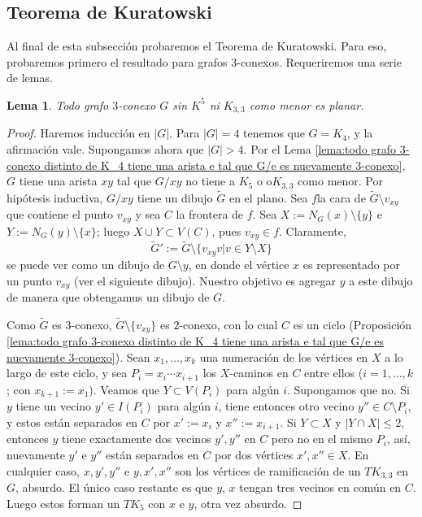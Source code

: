 \documentclass[12pt]{report}
\theoremstyle{plain}
\newtheorem{lemma}[theorem]{Lema}
\theoremstyle{definition}
\newcommand{\abs}[1]{\left \vert #1 \right \vert}
\begin{document}
\subsection{Teorema de Kuratowski}

Al final de esta subsección probaremos el Teorema de Kuratowski. Para eso, probaremos primero el resultado para grafos $3$-conexos. Requeriremos una serie de lemas.

\begin{lemma}\label{lema:teorema de Kuratowski - lema 1}
Todo grafo $3$-conexo $G$ sin $K^5$ ni $K_{3,3}$ como menor es planar.
\end{lemma}
\begin{proof}
Haremos inducción en $\abs G$. Para $\abs G = 4$ tenemos que $G = K_4$, y la afirmación vale. Supongamos ahora que $\abs G > 4$. Por el Lema \ref{lema:todo grafo 3-conexo distinto de K_4 tiene una arista e tal que G/e es nuevamente 3-conexo}, $G$ tiene una arista $xy$ tal que $G/xy$ no tiene a $K_5$ o o$K_{3,3}$ como menor. Por hipótesis inductiva, $G/xy$ tiene un dibujo $\tilde G$ en el plano. Sea $f$la cara de $\tilde G \setminus v_{xy}$ que contiene el punto $v_{xy}$ y sea $C$ la frontera de $f$. Sea $X := N_G (x) \setminus \{y\}$ e $Y := N_G (y) \setminus \{x \}$; luego $X \cup Y \subset V(C)$, pues $v_{xy} \in f$. Claramente,
\[
    \tilde G ' := \tilde G \setminus \{ v_{xy} v | v \in Y \setminus X \}
\]
se puede ver como un dibujo de $G \setminus y$, en donde el vértice $x$ es representado por un punto $v_{xy}$ (ver el siguiente dibujo). Nuestro objetivo es agregar $y$ a este dibujo de manera que obtengamus un dibujo de $G$.


Como $\tilde G$ es $3$-conexo, $\tilde G \setminus \{v_{xy}\}$ es $2$-conexo, con lo cual $C$ es un ciclo (Proposición \ref{lema:todo grafo 3-conexo distinto de K_4 tiene una arista e tal que G/e es nuevamente 3-conexo}). Sean $x_1, \ldots, x_k$ una numeración de los vértices en $X$ a lo largo de este ciclo, y sea $P_i = x_i \cdots x_{i+1}$ los $X$-caminos en $C$ entre ellos ($i = 1, \ldots, k$; con $x_{k+1} := x_1$). Veamos que $Y \subset V(P_i)$ para algún $i$. Supongamos que no. Si $y$ tiene un vecino $y' \in I(P_i)$ para algún $i$, tiene entonces otro vecino $y'' \in C \setminus P_i$, y estos están separados en $C$ por $x' := x_i$ y $x'' := x_{i+1}$. Si $Y \subset X$ y $\abs{Y \cap X} \leq 2$, entonces $y$ tiene exactamente dos vecinos $y', y''$ en $C$ pero no en el mismo $P_i$, así, nuevamente $y'$ e $y''$ están separados en $C$ por dos vértices $x',x'' \in X$. En cualquier caso, $x,y',y''$ e $y,x',x''$ son los vértices de ramificación de un $T K_{3,3}$ en $G$, absurdo. El único caso restante es que $y$, $x$ tengan tres vecinos en común en $C$. Luego estos forman un $T K_5$ con $x$ e $y$, otra vez absurdo.


\end{proof}
\end{document}
